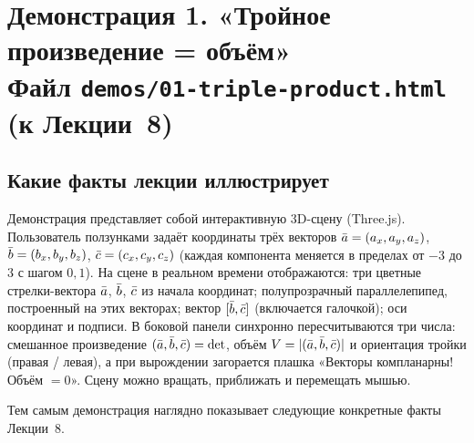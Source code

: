 \section*{Демонстрация 1. «Тройное произведение = объём»\\ \normalsize\textmd{Файл \texttt{demos/01-triple-product.html} \quad(к Лекции~8)}}

\subsection*{Какие факты лекции иллюстрирует}

Демонстрация представляет собой интерактивную 3D-сцену (Three.js). Пользователь
ползунками задаёт координаты трёх векторов $\bar{a}=(a_x,a_y,a_z)$,
$\bar{b}=(b_x,b_y,b_z)$, $\bar{c}=(c_x,c_y,c_z)$ (каждая компонента меняется в пределах
от $-3$ до $3$ с шагом $0{,}1$). На сцене в реальном времени отображаются:
три цветные стрелки-вектора $\bar{a}$, $\bar{b}$, $\bar{c}$ из начала координат;
полупрозрачный параллелепипед, построенный на этих векторах; вектор
$[\bar{b},\bar{c}]$ (включается галочкой); оси координат и подписи. В боковой панели
синхронно пересчитываются три числа: смешанное произведение
$(\bar{a},\bar{b},\bar{c})=\det$, объём $V=|(\bar{a},\bar{b},\bar{c})|$ и ориентация тройки (правая /
левая), а при вырождении загорается плашка «Векторы компланарны! Объём $=0$».
Сцену можно вращать, приближать и перемещать мышью.

Тем самым демонстрация наглядно показывает следующие конкретные факты
Лекции~8.

